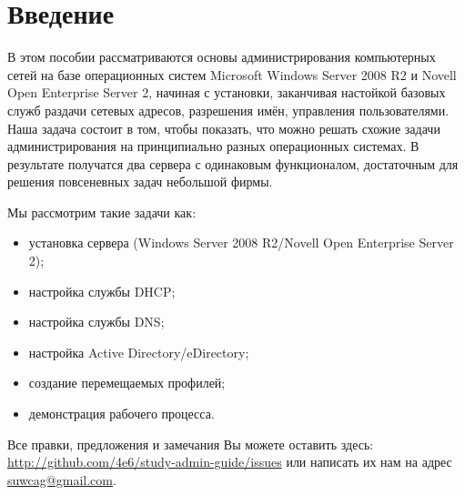 \documentclass[a4paper,12pt]{article}
\begin{document}

\restoregeometry
\tableofcontents
\newpage

\section*{Введение}
В этом пособии рассматриваются основы администрирования компьютерных сетей на базе операционных систем Microsoft Windows Server 2008 R2 и Novell Open Enterprise Server 2, начиная с установки, заканчивая настойкой базовых служб раздачи сетевых адресов, разрешения имён, управления пользователями. Наша задача состоит в том, чтобы показать, что можно решать схожие задачи администрирования на принципиально разных операционных системах. В результате получатся два сервера с одинаковым функционалом, достаточным для решения повсеневных задач небольшой фирмы.
\par
Мы рассмотрим такие задачи как:
\begin{itemize}
\item установка сервера (Windows Server 2008 R2/Novell Open Enterprise Server 2);
\item настройка службы DHCP;
\item настройка службы DNS;
\item настройка Active Directory/eDirectory;
\item создание перемещаемых профилей;
\item демонстрация рабочего процесса.
\end{itemize}
\par
Все правки, предложения и замечания Вы можете оставить здесь: \url{http://github.com/4e6/study-admin-guide/issues} или написать их нам на адрес \href{mailto:suwcag@gmail.com}{suwcag@gmail.com}.
\newpage
\setcounter{section}{0}

\newpage
\setcounter{section}{0}

\newpage
\setcounter{section}{0}

\newpage
\end{document}
